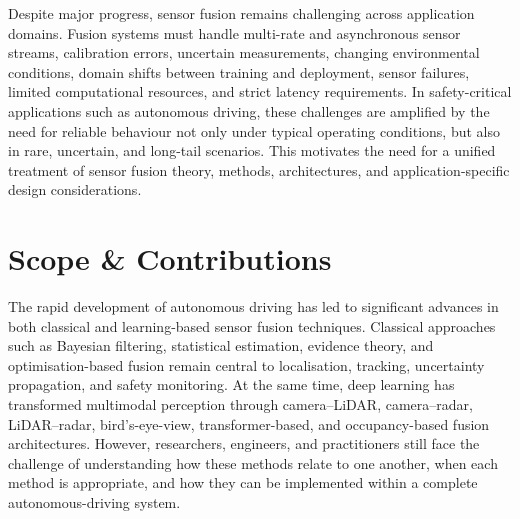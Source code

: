 \documentclass[11pt,oneside,openany]{book}
\begin{document}
Despite major progress, sensor fusion remains challenging across application domains. Fusion systems must handle multi-rate and asynchronous sensor streams, calibration errors, uncertain measurements, changing environmental conditions, domain shifts between training and deployment, sensor failures, limited computational resources, and strict latency requirements. In safety-critical applications such as autonomous driving, these challenges are amplified by the need for reliable behaviour not only under typical operating conditions, but also in rare, uncertain, and long-tail scenarios. This motivates the need for a unified treatment of sensor fusion theory, methods, architectures, and application-specific design considerations.

\section{Scope \& Contributions}

The rapid development of autonomous driving has led to significant advances in both classical and learning-based sensor fusion techniques. Classical approaches such as Bayesian filtering, statistical estimation, evidence theory, and optimisation-based fusion remain central to localisation, tracking, uncertainty propagation, and safety monitoring. At the same time, deep learning has transformed multimodal perception through camera--LiDAR, camera--radar, LiDAR--radar, bird's-eye-view, transformer-based, and occupancy-based fusion architectures. However, researchers, engineers, and practitioners still face the challenge of understanding how these methods relate to one another, when each method is appropriate, and how they can be implemented within a complete autonomous-driving system.
\end{document}
